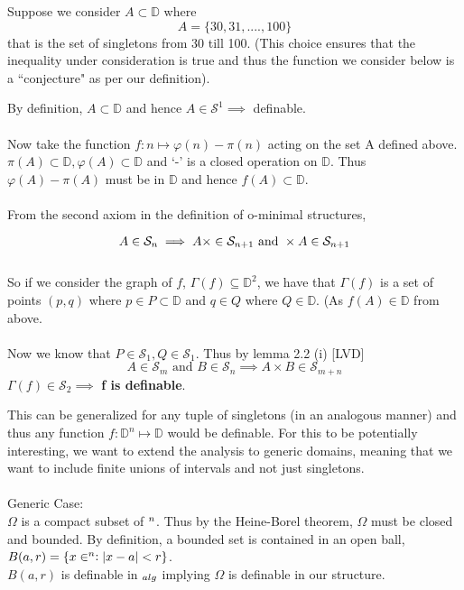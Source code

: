 Suppose we consider $A\subset\mathbb{D}$ where
\begin{equation*}
    A = \{30, 31,....,100\}
\end{equation*}
that is the set of singletons from 30 till 100. (This choice ensures that the inequality under consideration is true and thus the function we consider below is a ``conjecture" as per our definition).

By definition, $A\subset\mathbb{D}$ and hence $A\in\mathcal{S}^1 \implies $ definable.
\\\\
Now take the function $f: n\mapsto\varphi(n) - \pi(n)$ acting on the set A defined above. $\pi(A)\subset\mathbb{D}, \varphi(A)\subset\mathbb{D}$ and `-' is a closed operation on $\mathbb{D}$. Thus $\varphi(A) - \pi(A)$ must be in $\mathbb{D}$ and hence $f(A)\subset\mathbb{D}$.
\\\\
From the second axiom in the definition of o-minimal structures,

\begin{equation*}
    A \in \mathcal{S}_n\implies A \times\real\in\mathcal{S}_{n+1} \text{ and } \real \times A\in\mathcal{S}_{n+1}
\end{equation*}
\\
So if we consider the graph of $f$, $\Gamma(f)\subseteq\mathbb{D}^2$, we have that $\Gamma(f)$ is a set of points $(p,q)$ where $p\in P\subset\mathbb{D}$ and $q\in Q$ where $Q\in\mathbb{D}$. (As $f(A)\in\mathbb{D}$ from above.
\\\\
Now we know that $P\in\mathcal{S}_1, Q\in\mathcal{S}_1$. Thus by lemma 2.2 (i) [LVD]
\begin{equation*}
    A\in\mathcal{S}_m \text{ and } B\in\mathcal{S}_n \implies A\times B\in\mathcal{S}_{m+n}
\end{equation*}
$\Gamma(f)\in\mathcal{S}_2\implies$ \textbf{f is definable}.

This can be generalized for any tuple of singletons (in an analogous manner) and thus any function $f:\mathbb{D}^n\mapsto\mathbb{D}$ would be definable. For this to be potentially interesting, we want to extend the analysis to generic domains, meaning that we want to include finite unions of intervals and not just singletons.
\\\\
Generic Case:\\
$\Omega$ is a compact subset of $\real^n$. Thus by the Heine-Borel theorem, $\Omega$ must be closed and bounded. By definition, a bounded set is contained in an open ball, $B(a,r) = \{x\in\real^n:|x - a| < r\}$. \\$B(a, r)$ is definable in $\real_{alg}$ implying $\Omega$ is definable in our structure.

